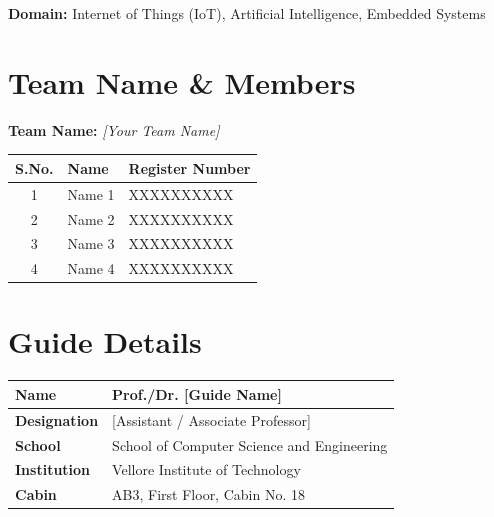 \documentclass[12pt,a4paper]{article}
\begin{document}
\textbf{Domain:} Internet of Things (IoT), Artificial Intelligence, Embedded Systems


\section{Team Name \& Members}

\textbf{Team Name:} \textit{[Your Team Name]}

\begin{table}[H]
\centering
\begin{tabular}{|c|l|l|}
\hline
\textbf{S.No.} & \textbf{Name} & \textbf{Register Number} \\
\hline
1 & Name 1 & XXXXXXXXXX \\
\hline
2 & Name 2 & XXXXXXXXXX \\
\hline
3 & Name 3 & XXXXXXXXXX \\
\hline
4 & Name 4 & XXXXXXXXXX \\
\hline
\end{tabular}
\end{table}


\section{Guide Details}

\begin{table}[H]
\centering
\begin{tabular}{|l|l|}
\hline
\textbf{Name} & Prof./Dr. [Guide Name] \\
\hline
\textbf{Designation} & [Assistant / Associate Professor] \\
\hline
\textbf{School} & School of Computer Science and Engineering \\
\hline
\textbf{Institution} & Vellore Institute of Technology \\
\hline
\textbf{Cabin} & AB3, First Floor, Cabin No. 18 \\
\hline
\end{tabular}
\end{table}

\end{document}
